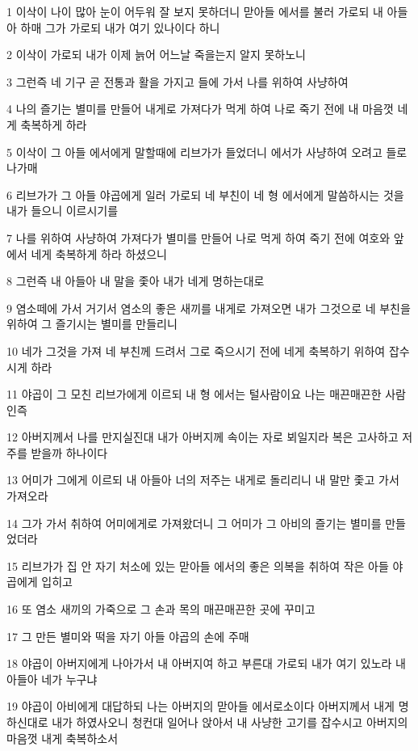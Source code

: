 \par 1 이삭이 나이 많아 눈이 어두워 잘 보지 못하더니 맏아들 에서를 불러 가로되 내 아들아 하매 그가 가로되 내가 여기 있나이다 하니
\par 2 이삭이 가로되 내가 이제 늙어 어느날 죽을는지 알지 못하노니
\par 3 그런즉 네 기구 곧 전통과 활을 가지고 들에 가서 나를 위하여 사냥하여
\par 4 나의 즐기는 별미를 만들어 내게로 가져다가 먹게 하여 나로 죽기 전에 내 마음껏 네게 축복하게 하라
\par 5 이삭이 그 아들 에서에게 말할때에 리브가가 들었더니 에서가 사냥하여 오려고 들로 나가매
\par 6 리브가가 그 아들 야곱에게 일러 가로되 네 부친이 네 형 에서에게 말씀하시는 것을 내가 들으니 이르시기를
\par 7 나를 위하여 사냥하여 가져다가 별미를 만들어 나로 먹게 하여 죽기 전에 여호와 앞에서 네게 축복하게 하라 하셨으니
\par 8 그런즉 내 아들아 내 말을 좇아 내가 네게 명하는대로
\par 9 염소떼에 가서 거기서 염소의 좋은 새끼를 내게로 가져오면 내가 그것으로 네 부친을 위하여 그 즐기시는 별미를 만들리니
\par 10 네가 그것을 가져 네 부친께 드려서 그로 죽으시기 전에 네게 축복하기 위하여 잡수시게 하라
\par 11 야곱이 그 모친 리브가에게 이르되 내 형 에서는 털사람이요 나는 매끈매끈한 사람인즉
\par 12 아버지께서 나를 만지실진대 내가 아버지께 속이는 자로 뵈일지라 복은 고사하고 저주를 받을까 하나이다
\par 13 어미가 그에게 이르되 내 아들아 너의 저주는 내게로 돌리리니 내 말만 좇고 가서 가져오라
\par 14 그가 가서 취하여 어미에게로 가져왔더니 그 어미가 그 아비의 즐기는 별미를 만들었더라
\par 15 리브가가 집 안 자기 처소에 있는 맏아들 에서의 좋은 의복을 취하여 작은 아들 야곱에게 입히고
\par 16 또 염소 새끼의 가죽으로 그 손과 목의 매끈매끈한 곳에 꾸미고
\par 17 그 만든 별미와 떡을 자기 아들 야곱의 손에 주매
\par 18 야곱이 아버지에게 나아가서 내 아버지여 하고 부른대 가로되 내가 여기 있노라 내 아들아 네가 누구냐
\par 19 야곱이 아비에게 대답하되 나는 아버지의 맏아들 에서로소이다 아버지께서 내게 명하신대로 내가 하였사오니 청컨대 일어나 앉아서 내 사냥한 고기를 잡수시고 아버지의 마음껏 내게 축복하소서
